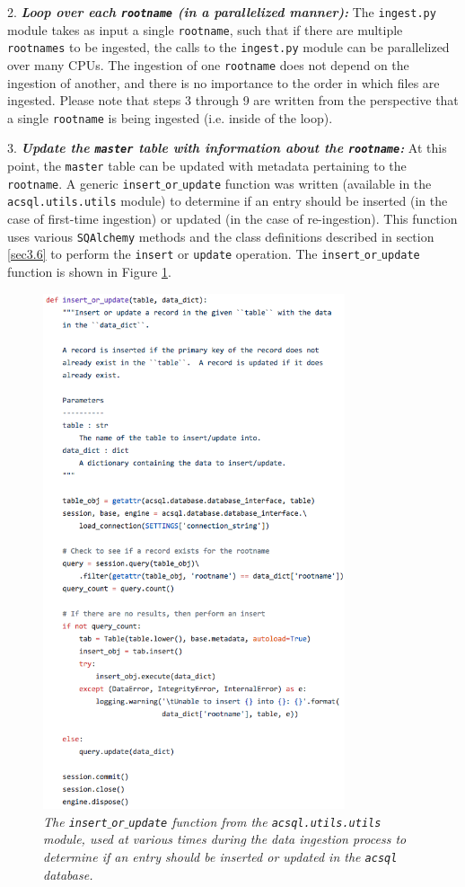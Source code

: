 \documentclass[10pt,journal,compsoc]{IEEEtran}
\begin{document}
2. \textbf{\textit{Loop over each \texttt{rootname} (in a parallelized manner):}}  The \texttt{ingest.py} module takes as input a single \texttt{rootname}, such that if there are multiple
\texttt{rootnames} to be ingested, the calls to the \texttt{ingest.py} module can be parallelized over many CPUs.  The ingestion of one \texttt{rootname} does not depend on the ingestion of
another, and there is no importance to the order in which files are ingested.  Please note that steps 3 through 9 are written from the perspective that a single \texttt{rootname} is being
ingested (i.e. inside of the loop).

3. \textbf{\textit{Update the \texttt{master} table with information about the \texttt{rootname}:}} At this point, the \texttt{master} table can be updated with metadata pertaining to the
\texttt{rootname}.  A generic \texttt{insert$\_$or$\_$update} function was written (available in the \texttt{acsql.utils.utils} module) to determine if an entry should be inserted (in the
case of first-time ingestion) or updated (in the case of re-ingestion). This function uses various \texttt{SQAlchemy} methods and the class definitions described
in section \ref{sec3.6} to perform the \texttt{insert} or \texttt{update} operation.  The \texttt{insert$\_$or$\_$update} function is shown in Figure \ref{fig19}.

\begin{figure}[!t]
\centering
\includegraphics[width=3.5in]{./figures/insert_or_update.png}
\caption{\textit{The \texttt{insert$\_$or$\_$update} function from the \texttt{acsql.utils.utils} module, used at various times during the data ingestion process to determine if an
entry should be inserted or updated in the \texttt{acsql} database.}}
\label{fig19}
\end{figure}
\end{document}
